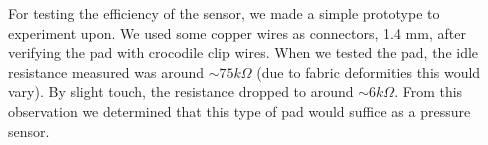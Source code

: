 \documentclass{sigchi-ext}
\begin{document}
For testing
the efficiency of the sensor, we made a
simple prototype to experiment upon.
We used some copper wires as connectors, 1.4 mm, after verifying the pad with
crocodile clip wires. When we tested the pad, the idle resistance measured was
around $\sim75k\Omega$ (due to fabric deformities this would vary). By slight touch, the resistance dropped to around $\sim6k\Omega$. From this observation we determined that 
this type of pad would suffice as a pressure sensor.

\end{document}
